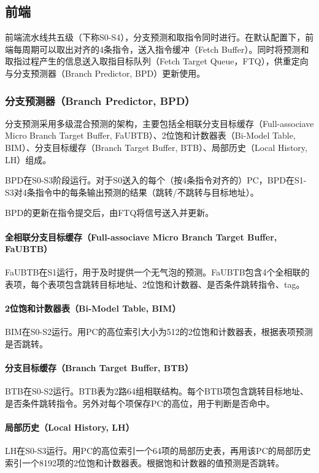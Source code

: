 \documentclass{article}
\begin{document}
\subsection{前端}
前端流水线共五级（下称S0-S4），分支预测和取指令同时进行。在默认配置下，前端每周期可以取出对齐的4条指令，送入指令缓冲（Fetch Buffer）。同时将预测和取指过程产生的信息送入取指目标队列（Fetch Target Queue，FTQ），供重定向与分支预测器（Branch Predictor, BPD）更新使用。\par
\subsubsection{分支预测器（Branch Predictor, BPD）}
分支预测采用多级混合预测的架构，主要包括全相联分支目标缓存（Full-associave Micro Branch Target Buffer, FaUBTB）、2位饱和计数器表（Bi-Model Table, BIM）、分支目标缓存（Branch Target Buffer, BTB）、局部历史（Local History, LH）组成。\par
BPD在S0-S3阶段运行。对于S0送入的每个（按4条指令对齐的）PC，BPD在S1-S3对4条指令中的每条输出预测的结果（跳转/不跳转与目标地址）。\par
BPD的更新在指令提交后，由FTQ将信号送入并更新。\par
\paragraph{全相联分支目标缓存（Full-associave Micro Branch Target Buffer, FaUBTB）}
FaUBTB在S1运行，用于及时提供一个无气泡的预测。FaUBTB包含4个全相联的表项，每个表项包含跳转目标地址、2位饱和计数器、是否条件跳转指令、tag。\par
\paragraph{2位饱和计数器表（Bi-Model Table, BIM）}
BIM在S0-S2运行。用PC的高位索引大小为512的2位饱和计数器表，根据表项预测是否跳转。\par
\paragraph{分支目标缓存（Branch Target Buffer, BTB）}
BTB在S0-S2运行。BTB表为2路64组相联结构。每个BTB项包含跳转目标地址、是否条件跳转指令。另外对每个项保存PC的高位，用于判断是否命中。\par
\paragraph{局部历史（Local History, LH）}
LH在S0-S3运行。用PC的高位索引一个64项的局部历史表，再用该PC的局部历史索引一个8192项的2位饱和计数器表。根据饱和计数器的值预测是否跳转。\par
\end{document}
